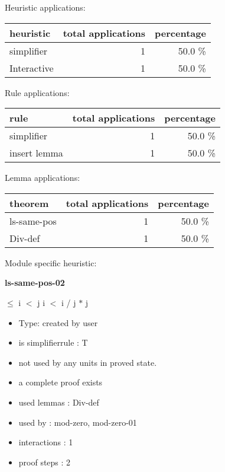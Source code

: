 \documentclass[a4paper]{article}
\begin{document}
\medskip


Heuristic applications:

\begin{supertabular}{l|r|r}
heuristic	& total applications & percentage \\ \hline
simplifier & 1 & 50.0 \% \\
Interactive & 1 & 50.0 \% \\

\end{supertabular}

Rule applications:

\begin{supertabular}{l|r|r}
rule	        & total applications & percentage \\ \hline
simplifier & 1 & 50.0 \% \\
insert lemma & 1 & 50.0 \% \\

\end{supertabular}

Lemma applications:

\begin{supertabular}{l|r|r}
theorem	        & total applications & percentage \\ \hline
ls-same-pos & 1 & 50.0 \% \\
Div-def & 1 & 50.0 \% \\

\end{supertabular}

Module specific heuristic:

\pagebreak

{\LARGE\bf ls-same-pos-02}\label{lemma-ls-same-pos-02}

\medskip

  $\le$ i  $<$ j \Imp \Not i $<$ i / j $*$ j

\begin{itemize}

\item Type: created by user

\item is simplifierrule : T
\item not used by any units in proved state.
\item       a complete proof exists
\item       used lemmas  : Div-def
\item       used by      : mod-zero, mod-zero-01
\item       interactions : 1
\item       proof steps  : 2
\end{itemize}
\end{document}
